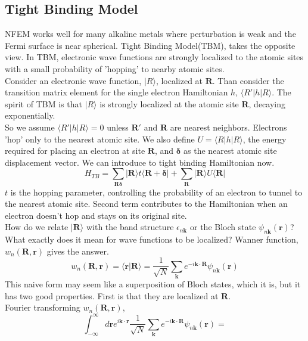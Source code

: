\documentclass{article}
\begin{document}
\subsection*{Tight Binding Model}
NFEM works well for many alkaline metals where perturbation is weak and the Fermi surface is near spherical. Tight Binding Model(TBM), takes the opposite view. In TBM, electronic wave functions are strongly localized to the atomic sites with a small probability of 'hopping' to nearby atomic sites.\\
Consider an electronic wave function, $|R\rangle$, localized at $\mathbf{R}$. Than consider the transition matrix element for the single electron Hamiltonian $h$, $\langle R'|h|R\rangle$. The spirit of TBM is that $|R\rangle$ is strongly localized at the atomic site $\mathbf{R}$, decaying exponentially.\\
So we assume $\langle R'|h|R\rangle=0$ unless $\mathbf{R'}$ and $\mathbf{R}$ are nearest neighbors. Electrons 'hop' only to the nearest atomic site. We also define $U=\langle R|h|R\rangle$, the energy required for placing an electron at site $\mathbf{R}$, and $\mathbf{\delta}$ as the nearest atomic site displacement vector. We can introduce to tight binding Hamiltonian now.
\begin{equation}
	H_{TB}=\sum_{\mathbf{R\delta}}|\mathbf{R}\rangle t\langle\mathbf{R}+\mathbf{\delta}|+\sum_{\mathbf{R}}|\mathbf{R}\rangle U\langle \mathbf{R}|
\end{equation}
$t$ is the hopping parameter, controlling the probability of an electron to tunnel to the nearest atomic site. Second term contributes to the Hamiltonian when an electron doesn't hop and stays on its original site.\\
How do we relate $|\mathbf{R}\rangle$ with the band structure $\epsilon_{n\mathbf{k}}$ or the Bloch state $\psi_{n\mathbf{k}}(\mathbf{r})$? What exactly does it mean for wave functions to be localized? Wanner function, $w_{n}(\mathbf{R},\mathbf{r})$ gives the answer.
$$w_{n}(\mathbf{R},\mathbf{r})=\langle \mathbf{r}|\mathbf{R}\rangle=\frac{1}{\sqrt{N}}\sum_{\mathbf{k}}e^{-i\mathbf{k}\cdot\mathbf{R}}\psi_{n\mathbf{k}}(\mathbf{r})$$
This naive form may seem like a superposition of Bloch states, which it is, but it has two good properties. First is that they are localized at $\mathbf{R}$.\\
Fourier transforming $w_n(\mathbf{R,r})$,
$$\int_{-\infty}^{\infty}d\mathbf{r}e^{i\mathbf{k}\cdot\mathbf{r}}\frac{1}{\sqrt{N}}\sum_{\mathbf{k}}e^{-i\mathbf{k}\cdot\mathbf{R}}\psi_{n\mathbf{k}}(\mathbf{r})=$$
\end{document}
